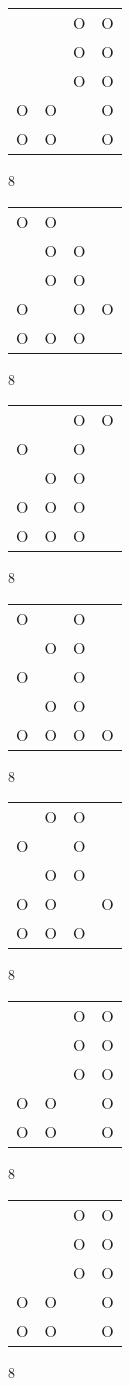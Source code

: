 \begin{tabular}{|m{0.2cm}m{0.2cm}m{0.2cm}m{0.2cm}|}\hline
 & &O&O\\
 & &O&O\\
 & &O&O\\
O&O& &O\\
O&O& &O\\
\hline\end{tabular}8
\begin{tabular}{|m{0.2cm}m{0.2cm}m{0.2cm}m{0.2cm}|}\hline
O&O& & \\
 &O&O& \\
 &O&O& \\
O& &O&O\\
O&O&O& \\
\hline\end{tabular}8
\begin{tabular}{|m{0.2cm}m{0.2cm}m{0.2cm}m{0.2cm}|}\hline
 & &O&O\\
O& &O& \\
 &O&O& \\
O&O&O& \\
O&O&O& \\
\hline\end{tabular}8
\begin{tabular}{|m{0.2cm}m{0.2cm}m{0.2cm}m{0.2cm}|}\hline
O& &O& \\
 &O&O& \\
O& &O& \\
 &O&O& \\
O&O&O&O\\
\hline\end{tabular}8
\begin{tabular}{|m{0.2cm}m{0.2cm}m{0.2cm}m{0.2cm}|}\hline
 &O&O& \\
O& &O& \\
 &O&O& \\
O&O& &O\\
O&O&O& \\
\hline\end{tabular}8
\begin{tabular}{|m{0.2cm}m{0.2cm}m{0.2cm}m{0.2cm}|}\hline
 & &O&O\\
 & &O&O\\
 & &O&O\\
O&O& &O\\
O&O& &O\\
\hline\end{tabular}8
\begin{tabular}{|m{0.2cm}m{0.2cm}m{0.2cm}m{0.2cm}|}\hline
 & &O&O\\
 & &O&O\\
 & &O&O\\
O&O& &O\\
O&O& &O\\
\hline\end{tabular}8
